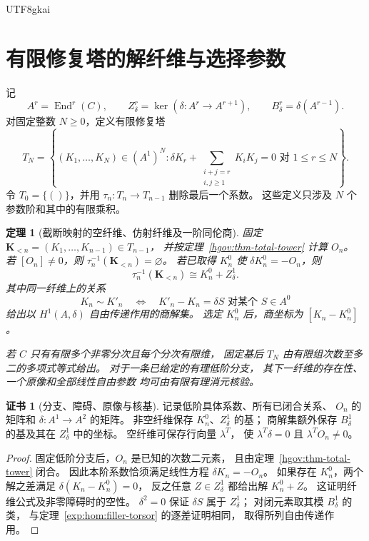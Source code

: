 \documentclass[12pt,a4paper,openany,notitlepage]{report}
\theoremstyle{plain}
\newtheorem{theorem}{定理}[chapter]
\theoremstyle{definition}
\newtheorem*{certificate}{证书}
\theoremstyle{remark}
\def\mathcal#1{#1}\def\mathsf#1{#1}\def\mathbb#1{#1}%
\begin{document}
\begin{CJK*}{UTF8}{gkai}
\section{有限修复塔的解纤维与选择参数}
\label{exp:hom:tower-fibres}

记
\[
 \mathcal A^r=\operatorname{End}^r(C),\qquad
 Z^r_\delta=\ker(\delta:\mathcal A^r\to\mathcal A^{r+1}),\qquad
 B^r_\delta=\delta(\mathcal A^{r-1}).
\]
对固定整数 $N\ge0$，定义有限修复塔
\[
 \mathcal T_N=
 \left\{(K_1,\ldots,K_N)\in(\mathcal A^1)^N:
 \delta K_r+\sum_{\substack{i+j=r\\i,j\ge1}}K_iK_j=0
 \text{ 对 }1\le r\le N\right\}.
\]
令 $\mathcal T_0=\{()\}$，并用
$\tau_n:\mathcal T_n\to\mathcal T_{n-1}$ 删除最后一个系数。
这些定义只涉及 $N$ 个参数阶和其中的有限乘积。

\begin{theorem}[截断映射的空纤维、仿射纤维及一阶同伦商]
\label{exp:hom:tower-fibre}
固定 $\mathbf K_{<n}=(K_1,\ldots,K_{n-1})\in\mathcal T_{n-1}$，
并按定理~\ref{hgov:thm-total-tower} 计算 $O_n$。
若 $[O_n]\ne0$，则
$\tau_n^{-1}(\mathbf K_{<n})=\varnothing$。
若已取得 $K_n^0$ 使 $\delta K_n^0=-O_n$，则
\[
 \tau_n^{-1}(\mathbf K_{<n})
 \cong K_n^0+Z^1_\delta.
\]
其中同一纤维上的关系
\[
 K_n\sim K'_n
 \quad\Longleftrightarrow\quad
 K'_n-K_n=\delta S
 \text{ 对某个 }S\in\mathcal A^0
\]
给出以 $H^1(\mathcal A,\delta)$ 自由传递作用的商解集。
选定 $K_n^0$ 后，商坐标为 $[K_n-K_n^0]$。

若 $C$ 只有有限多个非零分次且每个分次有限维，
固定基后 $\mathcal T_N$ 由有限组次数至多二的多项式等式给出。
对于一条已给定的有理低阶分支，
其下一纤维的存在性、一个原像和全部线性自由参数
均可由有限有理消元核验。
\end{theorem}
\begin{certificate}[分支、障碍、原像与核基]
记录低阶具体系数、所有已闭合关系、
$O_n$ 的矩阵和 $\delta:\mathcal A^1\to\mathcal A^2$ 的矩阵。
非空纤维保存 $K_n^0$、$Z^1_\delta$ 的基；
商解集额外保存 $B^1_\delta$ 的基及其在 $Z^1_\delta$ 中的坐标。
空纤维可保存行向量 $\lambda^{\mathsf T}$，
使 $\lambda^{\mathsf T}\delta=0$ 且 $\lambda^{\mathsf T}O_n\ne0$。
\end{certificate}
\begin{proof}
固定低阶分支后，$O_n$ 是已知的次数二元素，
且由定理~\ref{hgov:thm-total-tower} 闭合。
因此本阶系数恰须满足线性方程 $\delta K_n=-O_n$。
如果存在 $K_n^0$，两个解之差满足
$\delta(K_n-K_n^0)=0$，
反之任意 $Z\in Z^1_\delta$ 都给出解 $K_n^0+Z$。
这证明纤维公式及非零障碍时的空性。
$\delta^2=0$ 保证 $\delta S$ 属于 $Z^1_\delta$；
对闭元素取其模 $B^1_\delta$ 的类，
与定理~\ref{exp:hom:filler-torsor} 的逐差证明相同，
取得所列自由传递作用。


\end{proof}
\end{CJK*}
\end{document}
